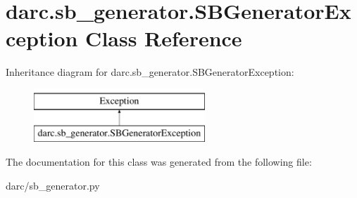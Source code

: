 \hypertarget{classdarc_1_1sb__generator_1_1_s_b_generator_exception}{}\section{darc.\+sb\+\_\+generator.\+S\+B\+Generator\+Exception Class Reference}
\label{classdarc_1_1sb__generator_1_1_s_b_generator_exception}
Inheritance diagram for darc.\+sb\+\_\+generator.\+S\+B\+Generator\+Exception\+:\begin{figure}[H]
\begin{center}
\leavevmode
\includegraphics[height=2.000000cm]{classdarc_1_1sb__generator_1_1_s_b_generator_exception}
\end{center}
\end{figure}


The documentation for this class was generated from the following file\+:\begin{DoxyCompactItemize}
\item 
darc/sb\+\_\+generator.\+py\end{DoxyCompactItemize}
